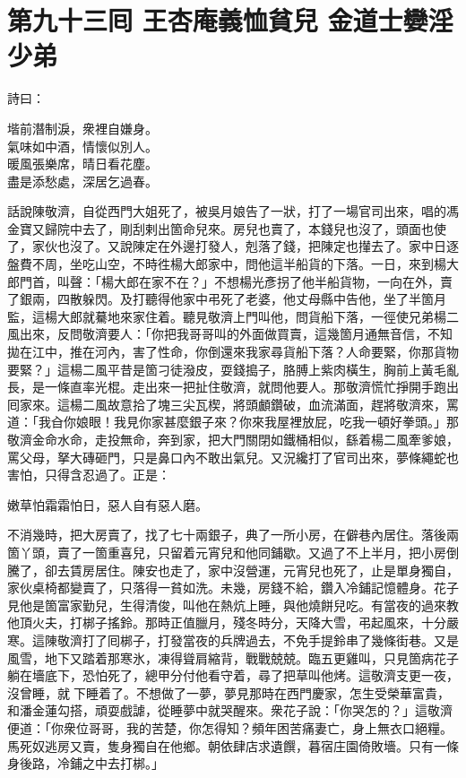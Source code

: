 
\chapter*{第九十三囘 王杏庵義恤貧兒 金道士孌淫少弟}


詩曰：

\begin{myquote}
堦前潛制淚，衆裡自嫌身。\\氣味如中酒，情懷似別人。\\暖風張樂席，晴日看花塵。\\盡是添愁處，深居乞過春。
\end{myquote}

話說陳敬濟，自從西門大姐死了，被吳月娘告了一狀，打了一場官司出來，唱的馮金寶又歸院中去了，剛刮剌出箇命兒來。{}房兒也賣了，本錢兒也沒了，頭面也使了，家伙也沒了。又說陳定在外邊打發人，剋落了錢，把陳定也攆去了。家中日逐盤費不周，坐吃山空，不時徃楊大郎家中，問他這半船貨的下落。一日，來到楊大郎門首，叫聲：「楊大郎在家不在？」不想楊光彥拐了他半船貨物，一向在外，賣了銀兩，四散躲閃。及打聽得他家中弔死了老婆，他丈母縣中告他，坐了半箇月監，這楊大郎就驀地來家住着。聽見敬濟上門叫他，問貨船下落，一徑使兄弟楊二風出來，反問敬濟要人：「你把我哥哥叫的外面做買賣，這幾箇月通無音信，不知拋在江中，推在河內，害了性命，你倒還來我家尋貨船下落？人命要緊，你那貨物要緊？」這楊二風平昔是箇刁徒潑皮，耍錢搗子，胳膊上紫肉橫生，胸前上黃毛亂長，是一條直率光棍。走出來一把扯住敬濟，就問他要人。那敬濟慌忙掙開手跑出囘家來。這楊二風故意拾了塊三尖瓦楔，將頭顱鑽破，血流滿面，趕將敬濟來，罵道：「我㒲你娘眼！我見你家甚麼銀子來？你來我屋裡放屁，吃我一頓好拳頭。」那敬濟金命水命，走投無命，奔到家，把大門關閉如鐵桶相似，繇着楊二風牽爹娘，罵父母，拏大磚砸門，只是鼻口內不敢出氣兒。又況纔打了官司出來，夢條繩蛇也害怕，只得含忍過了。正是：

\begin{myquote}
嫩草怕霜霜怕日，惡人自有惡人磨。
\end{myquote}

不消幾時，把大房賣了，找了七十兩銀子，典了一所小房，在僻巷內居住。落後兩箇丫頭，賣了一箇重喜兒，只留着元宵兒和他同鋪歇。又過了不上半月，把小房倒騰了，卻去賃房居住。陳安也走了，家中沒營運，元宵兒也死了，止是單身獨自，家伙桌椅都變賣了，只落得一貧如洗。{}未幾，房錢不給，鑽入冷鋪記憶體身。花子見他是箇富家勤兒，生得清俊，叫他在熱炕上睡，與他燒餅兒吃。有當夜的過來教他頂火夫，打梆子搖鈴。那時正值臘月，殘冬時分，天降大雪，弔起風來，十分嚴寒。這陳敬濟打了囘梆子，打發當夜的兵牌過去，不免手提鈴串了幾條街巷。又是風雪，地下又踏着那寒氷，凍得聳肩縮背，戰戰兢兢。臨五更雞叫，只見箇病花子躺在墻底下，恐怕死了，總甲分付他看守着，尋了把草叫他烤。這敬濟支更一夜，沒曾睡，就𢱉下睡着了。不想做了一夢，夢見那時在西門慶家，怎生受榮華富貴，和潘金蓮勾搭，頑耍戲謔，從睡夢中就哭醒來。衆花子說：「你哭怎的？」這敬濟便道：「你衆位哥哥，我的苦楚，你怎得知？頻年困苦痛妻亡，身上無衣口絕糧。馬死奴逃房又賣，隻身獨自在他鄉。朝依肆店求遺饌，暮宿庄園倚敗墻。只有一條身後路，冷鋪之中去打梆。」

